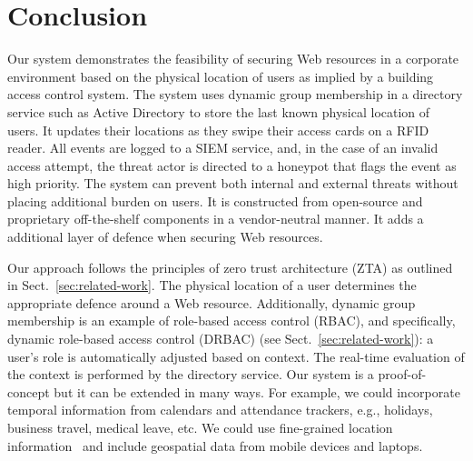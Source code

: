 \section{Conclusion}\label{sec:conclusion}

Our system demonstrates the feasibility of securing Web resources in a
corporate environment based on the physical location of users as
implied by a building access control system.  The system uses dynamic
group membership in a directory service such as Active Directory to
store the last known physical location of users.  It updates their
locations as they swipe their access cards on a RFID reader.  All
events are logged to a SIEM service, and, in the case of an invalid
access attempt, the threat actor is directed to a honeypot that flags
the event as high priority.  The system can prevent both internal and
external threats without placing additional burden on users.  It is
constructed from open-source and proprietary off-the-shelf components
in a vendor-neutral manner.  It adds a additional layer of defence
when securing Web resources.

Our approach follows the principles of zero trust architecture (ZTA)
as outlined in Sect.~\ref{sec:related-work}.  The physical location of
a user determines the appropriate defence around a Web resource.
Additionally, dynamic group membership is an example of role-based
access control (RBAC), and specifically, dynamic role-based access
control (DRBAC) (see Sect.~\ref{sec:related-work}): a user's role is
automatically adjusted based on context.  The real-time evaluation of
the context is performed by the directory service.  Our system is a
proof-of-concept but it can be extended in many ways.  For example, we
could incorporate temporal information from calendars and attendance
trackers, e.g., holidays, business travel, medical leave, etc.  We
could use fine-grained location information~\cite{kriplean-et-al-07}
and include geospatial data from mobile devices and laptops.

